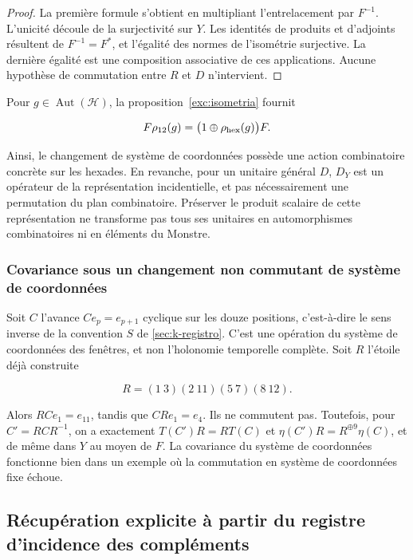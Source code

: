 \begin{proof}
La première formule s’obtient en multipliant l’entrelacement par \(F^{-1}\). L’unicité découle de la surjectivité sur \(Y\). Les identités de produits et d’adjoints résultent de \(F^{-1}=F^*\), et l’égalité des normes de l’isométrie surjective. La dernière égalité est une composition associative de ces applications. Aucune hypothèse de commutation entre \(R\) et \(D\) n’intervient.

\end{proof}

Pour \(g\in\operatorname{Aut}(\mathcal H)\), la proposition~\ref{exc:isometria} fournit

\[
F\rho_{12}(g)=\bigl(1\oplus\rho_{\rm hex}(g)\bigr)F.
\]

Ainsi, le changement de système de coordonnées possède une action combinatoire concrète sur les hexades. En revanche, pour un unitaire général \(D\), \(D_Y\) est un opérateur de la représentation incidentielle, et pas nécessairement une permutation du plan combinatoire. Préserver le produit scalaire de cette représentation ne transforme pas tous ses unitaires en automorphismes combinatoires ni en éléments du Monstre.

\subsubsection{Covariance sous un changement non commutant de système de coordonnées}

Soit \(C\) l’avance \(Ce_p=e_{p+1}\) cyclique sur les douze positions, c’est-à-dire le sens inverse de la convention \(S\) de \cref{sec:k-registro}. C’est une opération du système de coordonnées des fenêtres, et non l’holonomie temporelle complète. Soit \(R\) l’étoile déjà construite

\[
R=(1\ 3)(2\ 11)(5\ 7)(8\ 12).
\]

Alors \(RCe_1=e_{11}\), tandis que \(CRe_1=e_4\). Ils ne commutent pas. Toutefois, pour \(C'=RCR^{-1}\), on a exactement \(T(C')R=RT(C)\) et \(\eta(C')R=R^{\oplus9}\eta(C)\), et de même dans \(Y\) au moyen de \(F\). La covariance du système de coordonnées fonctionne bien dans un exemple où la commutation en système de coordonnées fixe échoue.

\subsection{Récupération explicite à partir du registre d’incidence des compléments}\label{nuc05:recuperacion}

